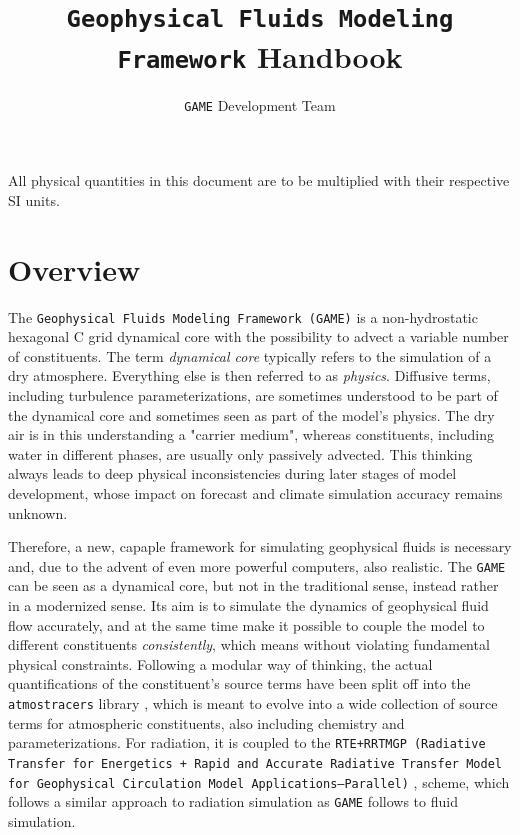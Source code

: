 \documentclass[10pt]{report}
\title{\texttt{Geophysical Fluids Modeling Framework} Handbook}
\author{\texttt{GAME} Development Team}
\date{}
\begin{document}
\maketitle

\vspace*{5 cm}
\begin{center}
All physical quantities in this document are to be multiplied with their respective SI units.
\end{center}

\newpage

\tableofcontents

\chapter{Overview}
\label{chap:overview}

The \texttt{Geophysical Fluids Modeling Framework (GAME)} is a non-hydrostatic hexagonal C grid dynamical core with the possibility to advect a variable number of constituents. The term \textit{dynamical core} typically refers to the simulation of a dry atmosphere. Everything else is then referred to as \textit{physics}. Diffusive terms, including turbulence parameterizations, are sometimes understood to be part of the dynamical core and sometimes seen as part of the model's physics. The dry air is in this understanding a "carrier medium", whereas constituents, including water in different phases, are usually only passively advected. This thinking always leads to deep physical inconsistencies during later stages of model development, whose impact on forecast and climate simulation accuracy remains unknown.

Therefore, a new, capaple framework for simulating geophysical fluids is necessary and, due to the advent of even more powerful computers, also realistic. The \texttt{GAME} can be seen as a dynamical core, but not in the traditional sense, instead rather in a modernized sense. Its aim is to simulate the dynamics of geophysical fluid flow accurately, and at the same time make it possible to couple the model to different constituents \textit{consistently}, which means without violating fundamental physical constraints. Following a modular way of thinking, the actual quantifications of the constituent's source terms have been split off into the \texttt{atmostracers} library \cite{atmostracers-github}, which is meant to evolve into a wide collection of source terms for atmospheric constituents, also including chemistry and parameterizations. For radiation, it is coupled to the \texttt{RTE+RRTMGP (Radiative Transfer for Energetics + Rapid and Accurate Radiative Transfer Model for Geophysical Circulation Model Applications—Parallel)} \cite{doi:10.1029/2019MS001621}, \cite{rte-rrtmgp-github} scheme, which follows a similar approach to radiation simulation as \texttt{GAME} follows to fluid simulation.
\end{document}
